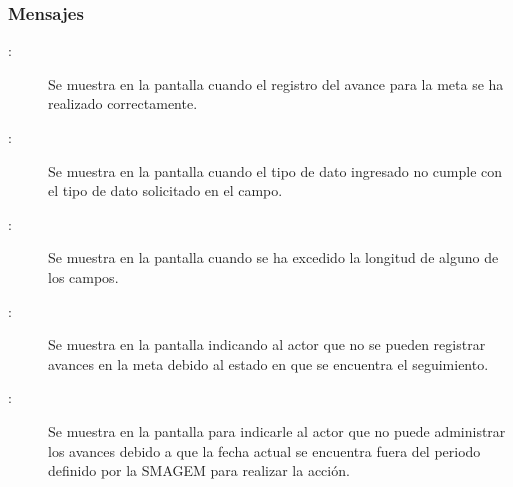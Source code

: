 \subsubsection{Mensajes}

    \begin{description}
    
        \item [:] Se muestra en la pantalla  cuando el registro del avance para la meta se ha realizado correctamente.
        
        \item [:] Se muestra en la pantalla  cuando el tipo de dato ingresado no cumple con el tipo de dato solicitado en el campo.
        
        \item [:] Se muestra en la pantalla  cuando se ha excedido la longitud de alguno de los campos.  
        
        \item [:] Se muestra en la pantalla  indicando al actor que no se pueden registrar avances en la meta debido al estado en que se encuentra el seguimiento.

        \item [:] Se muestra en la pantalla  para indicarle al actor que no puede administrar los avances debido a que la fecha actual se encuentra fuera del periodo definido por la SMAGEM para realizar la acción.
    \end{description}
